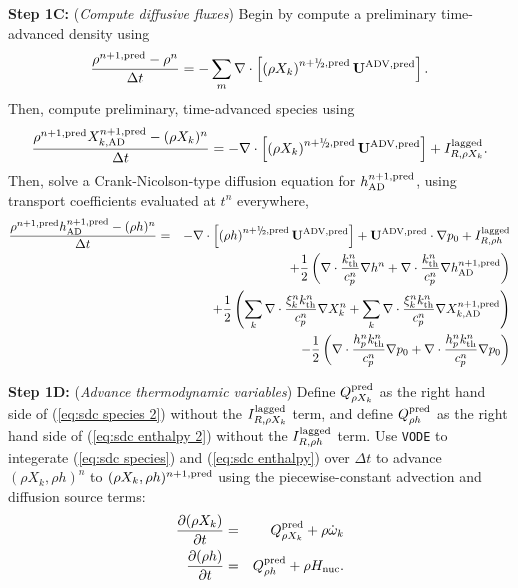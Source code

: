 {\bf Step 1C:} ({\it Compute diffusive fluxes}) Begin by compute a preliminary time-advanced density using
\begin{equation}
\frac{\rho^{n+1,{\rm pred}} - \rho^n}{\Delta t} = -\sum_m\nabla\cdot\left[\left(\rho X_k\right)^{n+\myhalf,{\rm pred}}\uadvsdcpred\right].
\end{equation}
Then, compute preliminary, time-advanced species using
\begin{equation}
\frac{\rho^{n+1,{\rm pred}}X_{k,{\rm AD}}^{n+1,{\rm pred}} - (\rho X_k)^n}{\Delta t} = -\nabla\cdot\left[\left(\rho X_k\right)^{n+\myhalf,{\rm pred}}\uadvsdcpred\right] + I_{R,\rho X_k}^{\rm lagged}.\label{eq:sdc species 2}
\end{equation}
Then, solve a Crank-Nicolson-type diffusion equation for $h^{n+1,{\rm pred}}_{\rm AD}$, using transport coefficients evaluated at $t^n$ everywhere,
\begin{eqnarray}
\frac{\rho^{n+1,{\rm pred}}h^{n+1,{\rm pred}}_{\rm AD} - (\rho h)^n}{\Delta t} &=& -\nabla\cdot\left[\left(\rho h\right)^{n+\myhalf,{\rm pred}}\uadvsdcpred\right] + \uadvsdcpred\cdot\nabla p_0 + I_{R,\rho h}^{\rm lagged}\nonumber\\
&& + \half\left(\nabla\cdot\frac{\kth^n}{c_p^n}\nabla h^n + \nabla\cdot\frac{\kth^n}{c_p^n}\nabla h_{\rm AD}^{n+1,{\rm pred}}\right)\nonumber\\
&& + \half\left(\sum_k\nabla\cdot\frac{\xi_k^n k_{\rm th}^n}{c_p^n}\nabla X_k^n + \sum_k\nabla\cdot\frac{\xi_k^n k_{\rm th}^n}{c_p^n}\nabla X_{k,{\rm AD}}^{n+1,{\rm pred}}\right)\nonumber\\
&& - \half\left(\nabla\cdot\frac{h_p^n k_{\rm th}^n}{c_p^n}\nabla p_0 + \nabla\cdot\frac{h_p^n k_{\rm th}^n}{c_p^n}\nabla p_0\right)\label{eq:sdc enthalpy 2}
\end{eqnarray}

{\bf Step 1D:} ({\it Advance thermodynamic variables}) Define $Q_{\rho X_k}^{\rm pred}$ as the right hand side of (\ref{eq:sdc species 2}) without the $I_{R,\rho X_k}^{\rm lagged}$ term, and define $Q_{\rho h}^{\rm pred}$ as the right hand side of (\ref{eq:sdc enthalpy 2}) without the $I_{R,\rho h}^{\rm lagged}$ term.  Use {\tt VODE} to integerate (\ref{eq:sdc species}) and (\ref{eq:sdc enthalpy}) over $\Delta t$ to advance $(\rho X_k, \rho h)^n$ to $(\rho X_k, \rho h)^{n+1,{\rm pred}}$ using the piecewise-constant advection and diffusion source terms:
\begin{eqnarray}
\frac{\partial(\rho X_k)}{\partial t} &=& Q_{\rho X_k}^{\rm pred} + \rho\dot\omega_k\\
\frac{\partial(\rho h)}{\partial t} &=& Q_{\rho h}^{\rm pred} + \rho{H_{\rm nuc}}.
\end{eqnarray}

